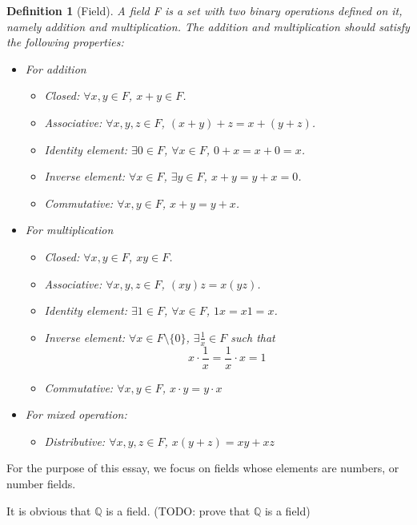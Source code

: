 \documentclass{article}
\newtheorem{definition}{Definition}[section]
\begin{document}
\begin{definition}[Field]
  A field F is a set with two binary operations defined on it, namely addition and
  multiplication. The addition and multiplication should satisfy the following
  properties:
  \begin{itemize}
    \item For addition
    \begin{itemize}
      \item Closed: $\forall x, y \in F$, $x + y \in F$.
      \item Associative: $\forall x, y, z \in F$, $(x + y) + z = x + (y + z)$.
      \item Identity element: $\exists 0 \in F$, $\forall x \in F$, $0 + x = x + 0 = x$.
      \item Inverse element: $\forall x \in F$, $\exists y \in F$, $x + y = y + x = 0$.
      \item Commutative: $\forall x, y \in F$, $x + y = y + x$.
    \end{itemize}
    \item For multiplication
    \begin{itemize}
      \item Closed: $\forall x, y \in F$, $xy \in F$.
      \item Associative: $\forall x, y, z \in F$, $(xy)z = x(yz)$.
      \item Identity element: $\exists 1 \in F$, $\forall x \in F$, $1x = x1 = x$.
      \item Inverse element: $\forall x \in F \setminus \{0\}$, $\exists \frac{1}{x} \in F$ such that
      \[
        x \cdot \frac{1}{x} = \frac{1}{x} \cdot x = 1
      \]
      \item Commutative: $\forall x, y \in F$, $x \cdot y = y \cdot x$
    \end{itemize}
    \item For mixed operation:
    \begin{itemize}
      \item Distributive: $\forall x, y, z \in F$, $x(y + z) = xy + xz$
    \end{itemize}
  \end{itemize}
\end{definition}

For the purpose of this essay, we focus on fields whose elements are numbers, or
number fields.

It is obvious that $\mathbb{Q}$ is a field. (TODO: prove that $\mathbb{Q}$ is a field)
\end{document}
